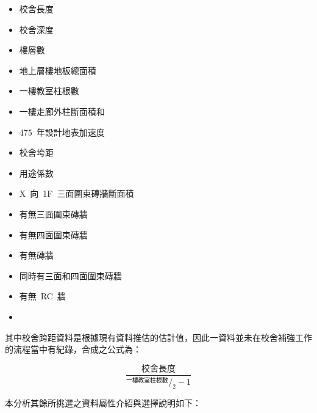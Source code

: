 \begin{multicols}{2}
\begin{itemize}
\item 校舍長度
\item 校舍深度
\item 樓層數
\item 地上層樓地板總面積
\item 一樓教室柱根數
\item 一樓走廊外柱斷面積和
\item 475~年設計地表加速度
\item 校舍垮距
\item 用途係數
\item X~向~1F~三面圍束磚牆斷面積
\item 有無三面圍束磚牆
\item 有無四面圍束磚牆
\item 有無磚牆
\item 同時有三面和四面圍束磚牆
\item 有無~RC~牆
\item[]
\end{itemize}
\end{multicols}

其中校舍跨距資料是根據現有資料推估的估計值，因此一資料並未在校舍補強工作的流程當中有紀錄，合成之公式為：

\begin{equation} \dfrac{\text{校舍長度}}{^{\text{一樓教室柱根數}}/_2 - 1} \label{eq:span}\end{equation} 

本分析其餘所挑選之資料屬性介紹與選擇說明如下：

